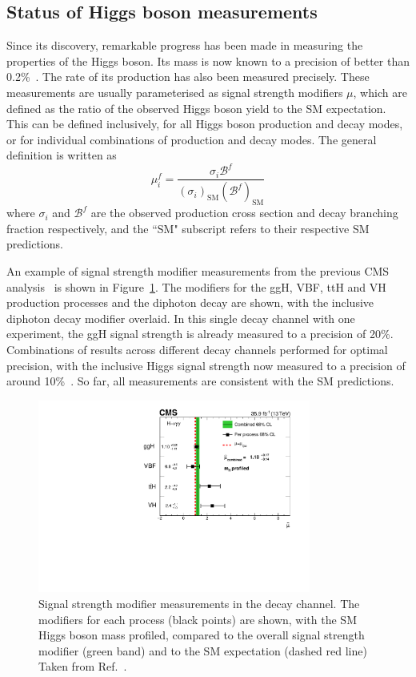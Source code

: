 \subsection{Status of Higgs boson measurements}

Since its discovery, remarkable progress has been made 
in measuring the properties of the Higgs boson.
Its mass is now known to a precision of better than 0.2\%~\cite{HIG-16-041}.
The rate of its production has also been measured precisely.
These measurements are usually parameterised as signal strength modifiers $\mu$,
which are defined as the ratio of the observed Higgs boson yield to the SM expectation.
This can be defined inclusively, for all Higgs boson production and decay modes, 
or for individual combinations of production and decay modes.
The general definition is written as
\begin{equation}
\mu^f_i = \frac{\sigma_i\mathcal{B}^f}{(\sigma_i)_{\textrm{SM}}(\mathcal{B}^f)_{\textrm{SM}}}
\end{equation}
where $\sigma_i$ and $\mathcal{B}^f$ are the observed production cross section 
and decay branching fraction respectively, 
and the ``SM" subscript refers to their respective SM predictions.

An example of signal strength modifier measurements 
from the previous CMS \Hgg analysis~\cite{HIG-16-040} is shown in Figure~\ref{fig:theory_PerProcTrad}.
The modifiers for the ggH, VBF, ttH and VH production processes and the diphoton decay are shown, 
with the inclusive diphoton decay modifier overlaid.
In this single decay channel with one experiment, 
the ggH signal strength is already measured to a precision of 20\%.
Combinations of results across different decay channels performed for optimal precision,
with the inclusive Higgs signal strength now measured 
to a precision of around 10\%~\cite{ATLAScomb,CMScomb}.
So far, all measurements are consistent with the SM predictions.

\begin{figure}[hptb]
\centering
\includegraphics[width=0.8\textwidth]{Figures/Theory/PerProcTrad.pdf}
\caption{
  Signal strength modifier measurements in the \Hgg decay channel.
  The modifiers for each process (black points) are shown, with the SM Higgs boson mass profiled, 
  compared to the overall signal strength modifier (green band) 
  and to the SM expectation (dashed red line)
  Taken from Ref.~\cite{HIG-16-040}.
}
\label{fig:theory_PerProcTrad}
\end{figure}

